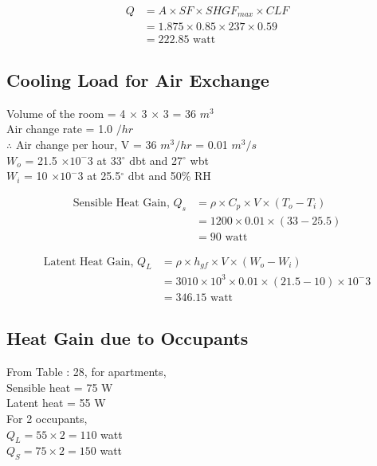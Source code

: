 \documentclass{article}
\begin{document}
    \begin{align*}
      Q &= A \times SF \times SHGF_{max} \times CLF \\
      &= 1.875 \times 0.85 \times 237 \times 0.59 \\
      &= 222.85 \text{ watt}
    \end{align*}

    \subsection{Cooling Load for Air Exchange}
    \begin{multicols}{2}
      
      Volume of the room = 4 $\times$ 3 $\times$ 3 = 36 $m^3$ \\
      Air change rate = 1.0 $/hr$ \\
      $\therefore$ Air change per hour, V = 36 $m^3/hr$ = 0.01 $m^3/s$ \\
      
      $W_o$ = 21.5 $\times 10^-3$ at 33$^\circ$ dbt and 27$^{\circ}$ wbt \\ 
      $W_i$ = 10 $\times 10^-3$ at 25.5$^\circ$ dbt and 50\% RH \\ 
    \end{multicols}

    \begin{align*}
      \text{Sensible Heat Gain, } Q_s &= \rho \times C_p \times V \times (T_o - T_i) \\
      &= 1200 \times 0.01 \times (33 - 25.5) \\
      &= 90 \text{ watt}
    \end{align*}
    
    \begin{align*}
      \text{Latent Heat Gain, } Q_L &= \rho \times h_{gf} \times V \times (W_o - W_i) \\
      &= 3010 \times 10^3 \times 0.01 \times (21.5 - 10) \times 10^-3 \\
      &= 346.15 \text{ watt}
    \end{align*}
    
    \subsection{Heat Gain due to Occupants}
    From Table : 28, for apartments, \\
    Sensible heat = 75 W \\
    Latent heat = 55 W \\
    For 2 occupants,\\
    $Q_L = 55 \times 2 = 110 $ watt \\
    $Q_S = 75 \times 2 = 150 $ watt \\
\end{document}
